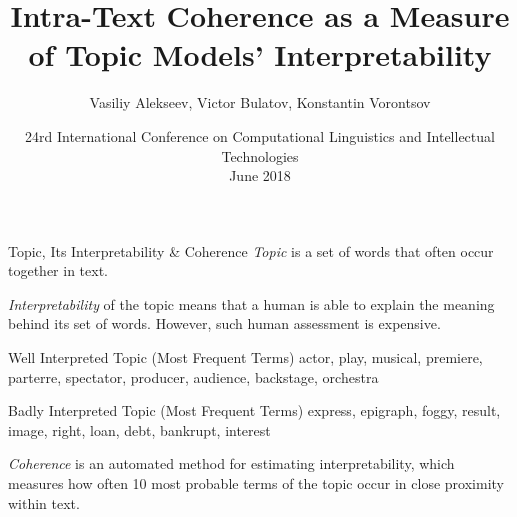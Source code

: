 \documentclass[russian]{beamer}
\title[Intra-Text Coherence]
{
  Intra-Text Coherence as a Measure of Topic Models’ Interpretability
}
\subtitle{}
\author[Vasiliy Alekseev]{
  Vasiliy Alekseev, %
  Victor Bulatov,
  Konstantin Vorontsov
}
\institute[]
{
  \footnotesize
}
\date[Dialogue 2018]
{
  \footnotesize
  {
    24rd International Conference on Computational Linguistics and Intellectual Technologies\\ \bigskip 1 June 2018
  }
}
\begin{document}

		

  
\frame{\titlepage}


\begin{frame}{Topic, Its Interpretability \& Coherence}
  \emph{Topic} is a set of words that often occur together in text.
  
  \medskip
  
  \emph{Interpretability} of the topic means that a human is able to explain the meaning behind its set of words.
  However, such human assessment is expensive.
  
  \vspace{0.25cm}
  
  \begin{exampleblock}{Well Interpreted Topic (Most Frequent Terms)}
    actor, play, musical, premiere, parterre, spectator, producer, audience, backstage, orchestra
  \end{exampleblock}
  
  \begin{alertblock}{Badly Interpreted Topic (Most Frequent Terms)}
    express, epigraph, foggy, result, image, right, 
    loan, debt, bankrupt, interest
  \end{alertblock}
  
  \smallskip
  
  \emph{Coherence} is an automated method for estimating interpretability, which measures how often 10 most probable terms of the topic occur in close proximity within text.
\end{frame}
\end{document}

